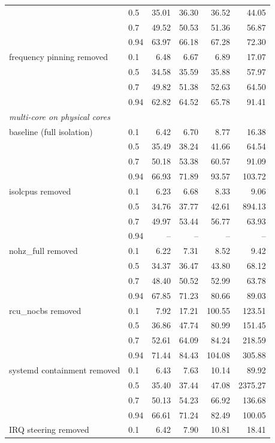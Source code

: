 \begin{tabular}{llrrrr}
 & 0.5 & 35.01 & 36.30 & 36.52 & 44.05 \\
 & 0.7 & 49.52 & 50.53 & 51.36 & 56.87 \\
 & 0.94 & 63.97 & 66.18 & 67.28 & 72.30 \\
\addlinespace
frequency pinning removed & 0.1 & 6.48 & 6.67 & 6.89 & 17.07 \\
 & 0.5 & 34.58 & 35.59 & 35.88 & 57.97 \\
 & 0.7 & 49.82 & 51.38 & 52.63 & 64.50 \\
 & 0.94 & 62.82 & 64.52 & 65.78 & 91.41 \\
\midrule
\multicolumn{6}{l}{\textit{multi-core on physical cores}} \\
baseline (full isolation) & 0.1 & 6.42 & 6.70 & 8.77 & 16.38 \\
 & 0.5 & 35.49 & 38.24 & 41.66 & 64.54 \\
 & 0.7 & 50.18 & 53.38 & 60.57 & 91.09 \\
 & 0.94 & 66.93 & 71.89 & 93.57 & 103.72 \\
\addlinespace
isolcpus removed & 0.1 & 6.23 & 6.68 & 8.33 & 9.06 \\
 & 0.5 & 34.76 & 37.77 & 42.61 & 894.13 \\
 & 0.7 & 49.97 & 53.44 & 56.77 & 63.93 \\
 & 0.94 & -- & -- & -- & -- \\
\addlinespace
nohz_full removed & 0.1 & 6.22 & 7.31 & 8.52 & 9.42 \\
 & 0.5 & 34.37 & 36.47 & 43.80 & 68.12 \\
 & 0.7 & 48.40 & 50.52 & 52.99 & 63.78 \\
 & 0.94 & 67.85 & 71.23 & 80.66 & 89.03 \\
\addlinespace
rcu_nocbs removed & 0.1 & 7.92 & 17.21 & 100.55 & 123.51 \\
 & 0.5 & 36.86 & 47.74 & 80.99 & 151.45 \\
 & 0.7 & 52.61 & 64.09 & 84.24 & 218.59 \\
 & 0.94 & 71.44 & 84.43 & 104.08 & 305.88 \\
\addlinespace
systemd containment removed & 0.1 & 6.43 & 7.63 & 10.14 & 89.92 \\
 & 0.5 & 35.40 & 37.44 & 47.08 & 2375.27 \\
 & 0.7 & 50.13 & 54.23 & 66.92 & 136.68 \\
 & 0.94 & 66.61 & 71.24 & 82.49 & 100.05 \\
\addlinespace
IRQ steering removed & 0.1 & 6.42 & 7.90 & 10.81 & 18.41 \\

\end{tabular}
